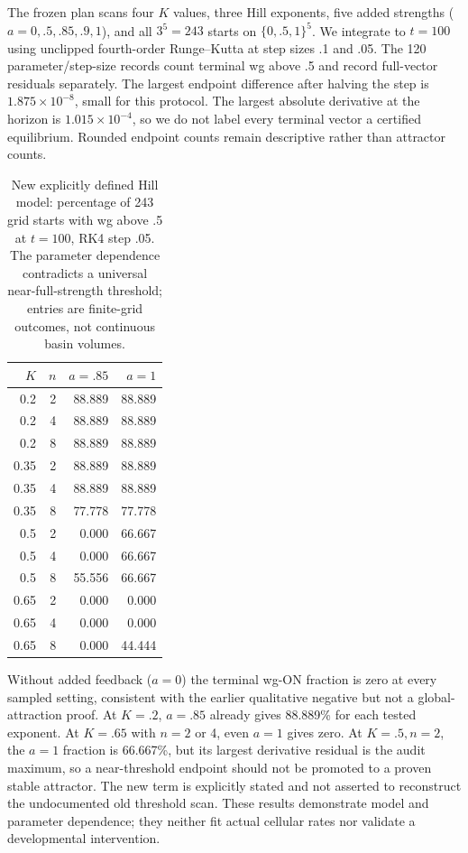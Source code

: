 The frozen plan scans four $K$ values, three Hill exponents, five added strengths ($a=0,.5,.85,.9,1$), and all $3^5=243$ starts on $\{0,.5,1\}^5$. We integrate to $t=100$ using unclipped fourth-order Runge--Kutta at step sizes .1 and .05. The 120 parameter/step-size records count terminal wg above .5 and record full-vector residuals separately. The largest endpoint difference after halving the step is $1.875\times10^{-8}$, small for this protocol. The largest absolute derivative at the horizon is $1.015\times10^{-4}$, so we do not label every terminal vector a certified equilibrium. Rounded endpoint counts remain descriptive rather than attractor counts.

\begin{table}[ht]\centering\small
\caption{New explicitly defined Hill model: percentage of 243 grid starts with wg above .5 at $t=100$, RK4 step .05. The parameter dependence contradicts a universal near-full-strength threshold; entries are finite-grid outcomes, not continuous basin volumes.}
\begin{tabular}{rrrr}\toprule
$K$ & $n$ & $a=.85$ & $a=1$\\\midrule
0.2 & 2 & 88.889 & 88.889 \\
0.2 & 4 & 88.889 & 88.889 \\
0.2 & 8 & 88.889 & 88.889 \\
0.35 & 2 & 88.889 & 88.889 \\
0.35 & 4 & 88.889 & 88.889 \\
0.35 & 8 & 77.778 & 77.778 \\
0.5 & 2 & 0.000 & 66.667 \\
0.5 & 4 & 0.000 & 66.667 \\
0.5 & 8 & 55.556 & 66.667 \\
0.65 & 2 & 0.000 & 0.000 \\
0.65 & 4 & 0.000 & 0.000 \\
0.65 & 8 & 0.000 & 44.444 \\
\bottomrule\end{tabular}\end{table}

Without added feedback ($a=0$) the terminal wg-ON fraction is zero at every sampled setting, consistent with the earlier qualitative negative but not a global-attraction proof. At $K=.2$, $a=.85$ already gives 88.889\% for each tested exponent. At $K=.65$ with $n=2$ or 4, even $a=1$ gives zero. At $K=.5,n=2$, the $a=1$ fraction is 66.667\%, but its largest derivative residual is the audit maximum, so a near-threshold endpoint should not be promoted to a proven stable attractor. The new term is explicitly stated and not asserted to reconstruct the undocumented old threshold scan. These results demonstrate model and parameter dependence; they neither fit actual cellular rates nor validate a developmental intervention.

